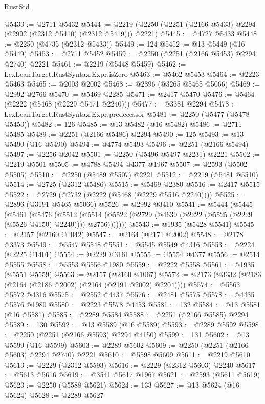 \begin{lexlean}{RustStd}
\begin{coremodule}
{\begin{coremodule}
{{{{{{{{{{{{{{{{{{{{{{{{{{{{{{{{{{{{{{{{{{{{{{{{{{{{{@5433 := @2711 @5432
@5444 := @2219 (@2250 (@2251 (@2166 @5433) @2294 (@2992 (@2312 @5410) (@2312 @5419))) @2221)
@5445 := @4727 @5433
@5448 := @2250 (@4735 (@2312 @5433))
@5449 := 124
@5452 := @13 @5449 (@16 @5449)
@5453 := @2711 @5452
@5459 := @2250 (@2251 (@2166 @5453) @2294 @2740) @2221
@5461 := @2219 (@5448 @5459)
@5462 := LexLeanTarget.RustSyntax.Expr.isZero
@5463 := @5462 @5453
@5464 := @2223 @5463
@5465 := @2003 @2002
@5468 := @2896 (@3265 @5465 @5066)
@5469 := @2992 @2766
@5470 := @5469 @2285
@5471 := @2417 @5470
@5476 := @5464 (@2222 (@5468 (@2229 @5471 @2240)))
@5477 := @3381 @2294
@5478 := LexLeanTarget.RustSyntax.Expr.predecessor
@5481 := @2250 (@5477 (@5478 @5453))
@5482 := 126
@5485 := @13 @5482 (@16 @5482)
@5486 := @2711 @5485
@5489 := @2251 (@2166 @5486) @2294
@5490 := 125
@5493 := @13 @5490 (@16 @5490)
@5494 := @4774 @5493
@5496 := @2251 (@2166 @5494)
@5497 := @2256 @2042
@5501 := @2250 (@5496 @5497 @2231) @2221
@5502 := @2219 @5501
@5505 := @4788 @5494 @4377 @1967
@5507 := @2593 (@5502 @5505)
@5510 := @2250 (@5489 @5507) @2221
@5512 := @2219 (@5481 @5510)
@5514 := @2725 (@2312 @5486)
@5515 := @5469 @2380
@5516 := @2417 @5515
@5522 := @2729 (@2732 (@2222 (@5468 (@2229 @5516 @2240))))
@5525 := @2896 (@3191 @5465 @5066)
@5526 := @2992 @3410
@5541 := @5444
    (@5445
      (@5461
        (@5476
          (@5512
            (@5514 (@5522 (@2729 (@4639 (@2222 (@5525 (@2229 (@5526 @4150) @2240)))) @2756)))))))
@5543 := @1935 (@5428 @5541)
@5545 := @2157 (@2160 @1042)
@5547 := @2164 (@2171 @2002)
@5548 := @2178 @3373
@5549 := @5547 @5548
@5551 := @5545 @5549 @4316
@5553 := @2224 (@2225 @1401)
@5554 := @2229 @3161
@5555 := @5554 @4377
@5556 := @2514 @5555
@5558 := @5553 @5556 @1980
@5559 := @2222 @5558
@5561 := @1935 (@5551 @5559)
@5563 := @2157 (@2160 @1067)
@5572 := @2173 (@3332 (@2183 (@2164 (@2186 @2002) (@2164 (@2191 @2002) @2204))))
@5574 := @5563 @5572 @4316
@5575 := @2552 @4437
@5576 := @2481 @5575
@5578 := @4435 @5576 @1980
@5580 := @2223 @5578 @4453
@5581 := 132
@5584 := @13 @5581 (@16 @5581)
@5585 := @2289 @5584
@5588 := @2251 (@2166 @5585) @2294
@5589 := 130
@5592 := @13 @5589 (@16 @5589)
@5593 := @2289 @5592
@5598 := @2250 (@2251 (@2166 @5593) @2294 @4150)
@5599 := 131
@5602 := @13 @5599 (@16 @5599)
@5603 := @2289 @5602
@5609 := @2250 (@2251 (@2166 @5603) @2294 @2740) @2221
@5610 := @5598 @5609
@5611 := @2219 @5610
@5613 := @2229 (@2312 @5593)
@5616 := @2229 (@2312 @5603) @2240
@5617 := @5613 @5616
@5619 := @3541 @5617 @1967
@5621 := @2593 (@5611 @5619)
@5623 := @2250 (@5588 @5621)
@5624 := 133
@5627 := @13 @5624 (@16 @5624)
@5628 := @2289 @5627
}}}}}}}}}}}}}}}}}}}}}}}}}}}}}}}}}}}}}}}}}}}}}}}}}}}}}
\end{coremodule}}
\end{coremodule}
\end{lexlean}

